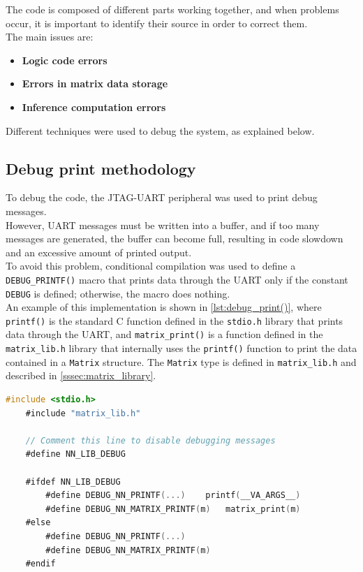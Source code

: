 
The code is composed of different parts working together, and when problems occur, it is important to identify their source in order to correct them. \\
The main issues are:

\begin{itemize}
    \setlength\itemsep{0pt}
    \setlength\parskip{0pt}
    \item \textbf{Logic code errors}
    \item \textbf{Errors in matrix data storage}
    \item \textbf{Inference computation errors}
\end{itemize}

\noindent
Different techniques were used to debug the system, as explained below.

\subsection{Debug print methodology}

To debug the code, the JTAG-UART peripheral was used to print debug messages. \\
However, UART messages must be written into a buffer, and if too many messages are generated, the buffer can become full, resulting in code slowdown and an excessive amount of printed output. \\
To avoid this problem, conditional compilation was used to define a \\\texttt{DEBUG\_PRINTF()} macro that prints data through the UART only if the constant \texttt{DEBUG} is defined; otherwise, the macro does nothing. \\
An example of this implementation is shown in \autoref{lst:debug_print()}, where \texttt{printf()} is the standard C function defined in the \texttt{stdio.h} library that prints data through the UART, and \texttt{matrix\_print()} is a function defined in the \texttt{matrix\_lib.h} library that internally uses the \texttt{printf()} function to print the data contained in a \texttt{Matrix} structure. The \texttt{Matrix} type is defined in \texttt{matrix\_lib.h} and described in \autoref{sssec:matrix_library}.

\vspace{1em}
\begin{lstlisting}[language=C, caption={\texttt{DEBUG\_PRINT()} macro definition for the NN library}, label={lst:debug_print()}, morekeywords={Matrix,\#include,\#define,\#ifdef,\#ifndef,\#else,\#endif}, alsoletter={\#}]
    #include <stdio.h>
    #include "matrix_lib.h"
    
    // Comment this line to disable debugging messages
    #define NN_LIB_DEBUG
    
    #ifdef NN_LIB_DEBUG
        #define DEBUG_NN_PRINTF(...)    printf(__VA_ARGS__)
        #define DEBUG_NN_MATRIX_PRINTF(m)   matrix_print(m)
    #else 
        #define DEBUG_NN_PRINTF(...)
        #define DEBUG_NN_MATRIX_PRINTF(m)
    #endif
\end{lstlisting}

